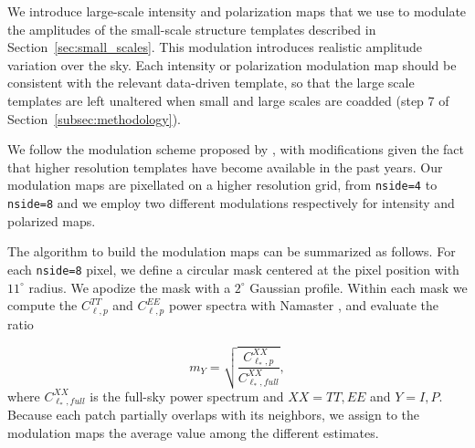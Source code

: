 We introduce large-scale intensity and polarization maps that we use to modulate the amplitudes of the small-scale structure templates described in Section~\ref{sec:small_scales}. This modulation introduces realistic amplitude variation over the sky.
Each intensity or polarization modulation map should be consistent with the relevant data-driven template, so that the large scale templates are left unaltered when small and large scales are coadded (step 7 of Section~\ref{subsec:methodology}).


We follow the modulation scheme proposed by \citet{Thorne:2017}, with modifications given the fact that higher resolution templates have become available in the past years. Our modulation maps are pixellated on a higher resolution grid, from \texttt{nside=4}  \citep{Thorne:2017} to \texttt{nside=8} and we employ two different modulations respectively for intensity and polarized maps.

The algorithm to build the modulation maps can be summarized as follows. For each \texttt{nside=8} pixel, we define a circular mask centered at the pixel position with $11^\circ$ radius. We apodize the mask with a $2^\circ$ Gaussian profile. Within each mask we compute the $C^{TT}_{\ell, p}$ and $C^{EE}_{\ell,p}$  power spectra with Namaster \citep{Alonso:2019}, and evaluate the ratio 

\begin{equation*}
    m_Y= \sqrt{\frac{C^{XX}_{\ell_*,p}}{C^{XX}_{\ell_*,full}}}, 
\end{equation*}
where $C^{XX}_{\ell_*,full} $ is the full-sky power spectrum and $XX= TT, EE$ and $Y=I, P$. Because each patch partially overlaps with its neighbors, we assign to the modulation maps the average value among the different estimates.



